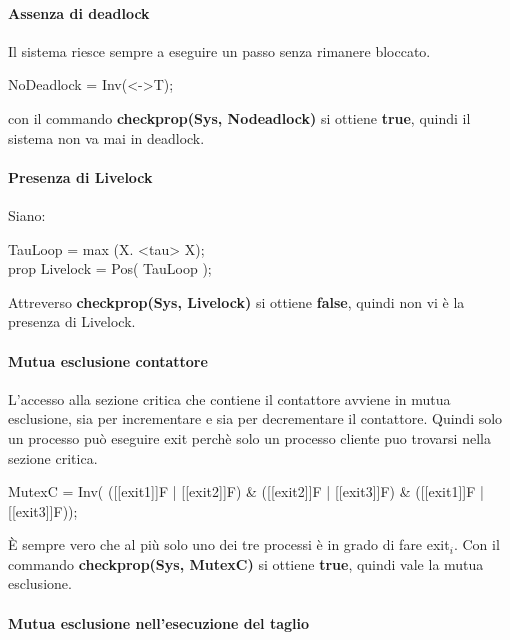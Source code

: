 \paragraph{Assenza di deadlock}\mbox{}

Il sistema riesce sempre a eseguire un passo senza rimanere bloccato.

\begin{center}
	\textsf{NoDeadlock = Inv(<->T);}
\end{center}

con il commando \textbf{checkprop(Sys, Nodeadlock)} si ottiene \textbf{true}, quindi il sistema non va mai in deadlock.

\paragraph{Presenza di Livelock}\mbox{}

Siano:

\begin{center}
	\textsf{TauLoop = max (X. <tau> X);}\\
	\textsf{prop Livelock = Pos( TauLoop );}
\end{center}

Attreverso \textbf{checkprop(Sys, Livelock)} si ottiene \textbf{false}, quindi non vi è la presenza di Livelock.

\paragraph{Mutua esclusione contattore}\mbox{}

L'accesso alla sezione critica che contiene il contattore avviene in mutua esclusione, sia per incrementare e sia per decrementare il contattore. Quindi solo un processo può eseguire exit perchè solo un processo cliente puo trovarsi nella sezione critica.

\begin{center}
	\textsf{MutexC = Inv(
	([[exit1]]F | [[exit2]]F) \& 
 ([[exit2]]F | [[exit3]]F) \&
([[exit1]]F | [[exit3]]F));}
\end{center}

È sempre vero che al più solo uno dei tre processi è in grado di fare \textsf{exit$_{i}$}. Con il commando \textbf{checkprop(Sys, MutexC)} si ottiene \textbf{true}, quindi vale la mutua esclusione.

\paragraph{Mutua esclusione nell'esecuzione del taglio}\mbox{}


